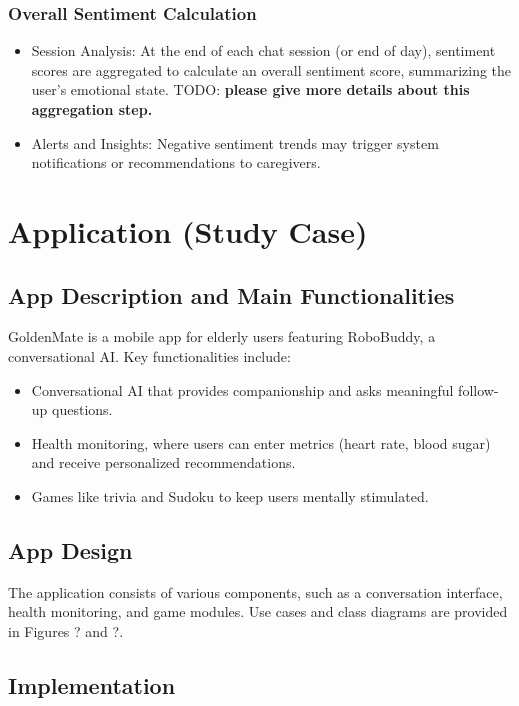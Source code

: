 \documentclass[runningheads,a4paper,11pt]{report}
\newcommand{\todoL}[1]{{\color{green} TODO: \color{green} \textbf{#1}}}
\begin{document}
\subsection{Overall Sentiment Calculation}
\begin{itemize}
    \item Session Analysis: At the end of each chat session (or end of day), sentiment scores are aggregated to calculate an overall sentiment score, summarizing the user's emotional state.
    \todoL{please give more details about this aggregation step. }
    \item Alerts and Insights: Negative sentiment trends may trigger system notifications or recommendations to caregivers.
\end{itemize}

\chapter{Application (Study Case)}
\label{chapter:application}

\section{App Description and Main Functionalities}
\label{section:appDescription}

GoldenMate is a mobile app for elderly users featuring RoboBuddy, a conversational AI. Key functionalities include:
\begin{itemize}
\item Conversational AI that provides companionship and asks meaningful follow-up questions.
\item Health monitoring, where users can enter metrics (heart rate, blood sugar) and receive personalized recommendations.
\item Games like trivia and Sudoku to keep users mentally stimulated.
\end{itemize}

\section{App Design}
\label{section:appDesign}

The application consists of various components, such as a conversation interface, health monitoring, and game modules. Use cases and class diagrams are provided in Figures ? and ?.

\section{Implementation}
\label{section:appImplementation}
\end{document}
